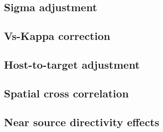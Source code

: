 \subsection{Sigma adjustment}
%
\subsection{Vs-Kappa correction}
%
\subsection{Host-to-target adjustment}
%
\subsection{Spatial cross correlation}
%
\subsection{Near source directivity effects}
